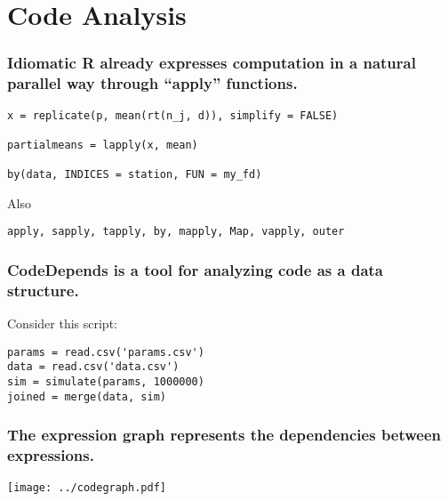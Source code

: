 \documentclass{beamer}
\begin{document}
\section{Code Analysis}

\begin{frame}[fragile]

    \frametitle{Idiomatic R already expresses computation in a natural
    parallel way through ``apply'' functions.}


\begin{verbatim}
x = replicate(p, mean(rt(n_j, d)), simplify = FALSE)

partialmeans = lapply(x, mean)

by(data, INDICES = station, FUN = my_fd)
\end{verbatim}

\pause

Also
\begin{verbatim}
apply, sapply, tapply, by, mapply, Map, vapply, outer
\end{verbatim}

\end{frame}
\begin{frame}[fragile]

    \frametitle{CodeDepends is a tool for analyzing code as a data
    structure.}


    Consider this script:

\begin{verbatim}
params = read.csv('params.csv')
data = read.csv('data.csv')
sim = simulate(params, 1000000)
joined = merge(data, sim)
\end{verbatim}

\end{frame}
\begin{frame}

    \frametitle{The expression graph represents the dependencies between
    expressions.}


    \centerline{\texttt{[image: ../codegraph.pdf]}}

\end{frame}
\end{document}
